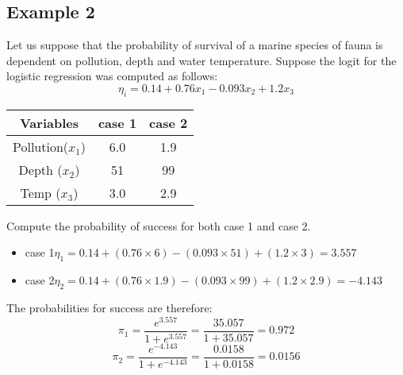 \subsection{Example 2}
Let us suppose that the probability of survival of a marine species of fauna is dependent on pollution, depth and water temperature. Suppose the logit for the logistic regression was computed as follows:
\[ \eta_i = 0.14 + 0.76x_1 - 0.093x_2 + 1.2x_3  \]
\begin{center}
\begin{tabular}{|c|c|c|}
  \hline
Variables & case 1 & case 2 \\ \hline
Pollution($x_1$) & 6.0 & 1.9 \\
Depth ($x_2$)& 51 & 99 \\
Temp ($x_3$) & 3.0 & 2.9 \\
  \hline
\end{tabular}
\end{center}
Compute the probability of success for both case 1 and case 2.

\begin{itemize}
\item case 1$ \eta_1 = 0.14 + (0.76 \times 6)	- (0.093\times 51) + (1.2\times 3) = 3.557$
\item case 2$ \eta_2 = 0.14 + (0.76 \times 1.9)	- (0.093\times 99) + (1.2\times 2.9) = -4.143$
\end{itemize}

The probabilities for success are therefore:
\[ \pi_1  =  \frac{e^{3.557}}{1 + e^{3.557}} = \frac{35.057}{1 + 35.057} = 0.972 \]
\[ \pi_2  =  \frac{e^{-4.143}}{1 + e^{-4.143}} = \frac{0.0158}{1 + 0.0158} = 0.0156 \]

